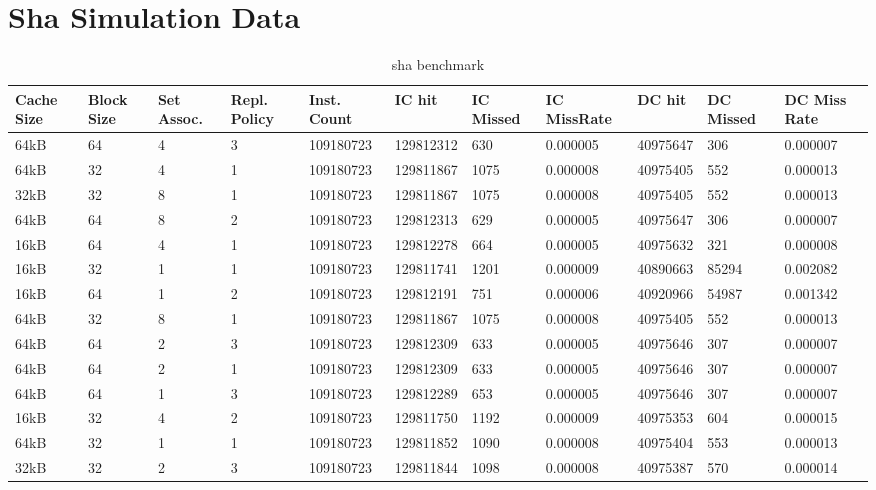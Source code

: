 \documentclass[conference]{IEEEtran}
\begin{document}
\section{Sha Simulation Data}
  \begin{table}
    \centering
    \caption{sha benchmark}
    \begin{tabular}{|m{.75cm} |m{.75cm} |m{.8cm} | m{.75cm} | l | l | l | l | l | l | l |}
      \hline
      \textbf{Cache Size} & \textbf{ Block Size} & \textbf{Set Assoc.} & \textbf{Repl. Policy} & \textbf{Inst. Count} & \textbf{IC hit} & \textbf{IC Missed} & \textbf{IC MissRate} & \textbf{DC hit} & \textbf{DC Missed} & \textbf{DC Miss Rate} \\ \hline
      
64kB&	64&	4&	3&	109180723&	129812312&	630	&  0.000005&	40975647	&306	  &0.000007 \\ \hline
64kB&	32&	4&	1&	109180723&	129811867&	1075&	0.000008	&40975405	  &552	  &0.000013 \\ \hline
32kB&	32&	8&	1&	109180723&	129811867&	1075&	0.000008	&40975405	  &552	  &0.000013 \\ \hline
64kB&	64&	8&	2&	109180723&	129812313&	629	&  0.000005&	40975647	&306	  &0.000007 \\ \hline
16kB&	64&	4&	1&	109180723&	129812278&	664	&  0.000005&	40975632	&321	  &0.000008 \\ \hline
16kB&	32&	1&	1&	109180723&	129811741&	1201&	0.000009	&40890663	  &85294	&0.002082 \\ \hline
16kB&	64&	1&	2&	109180723&	129812191&	751	&  0.000006&	40920966	&54987	&0.001342 \\ \hline
64kB&	32&	8&	1&	109180723&	129811867&	1075&	0.000008	&40975405	  &552	  &0.000013 \\ \hline
64kB&	64&	2&	3&	109180723&	129812309&	633	&  0.000005&	40975646	&307	  &0.000007 \\ \hline
64kB&	64&	2&	1&	109180723&	129812309&	633	&  0.000005&	40975646	&307	  &0.000007 \\ \hline
64kB&	64&	1&	3&	109180723&	129812289&	653	&  0.000005&	40975646	&307	  &0.000007 \\ \hline
16kB&	32&	4&	2&	109180723&	129811750&	1192&	0.000009	&40975353	  &604	  &0.000015 \\ \hline
64kB&	32&	1&	1&	109180723&	129811852&	1090&	0.000008	&40975404	  &553	  &0.000013 \\ \hline
32kB&	32&	2&	3&	109180723&	129811844&	1098&	0.000008	&40975387	  &570	  &0.000014 \\ \hline

\end{tabular}
\end{table}
\end{document}
